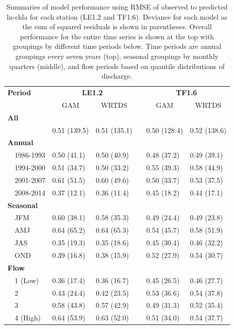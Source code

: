 \documentclass[letterpaper,12pt,oneside]{article}\usepackage[]{graphicx}\usepackage[]{color}
\begin{document}
\begin{table}[!tbp]
\caption{Summaries of model performance using \ac{RMSE} of observed to predicted ln-\ac{chla} for each station (LE1.2 and TF1.6).  Deviance for each model as the sum of squared residuals is shown in parentheses. Overall performance for the entire time series is shown at the top with groupings by different time periods below.  Time periods are annual groupings every seven years (top), seasonal groupings by monthly quarters (middle), and flow periods based on quantile distributions of discharge.\label{tab:perftoobs}} 
\begin{center}
\begin{tabular}{lllcll}
\hline\hline
\multicolumn{1}{l}{\bfseries Period}&\multicolumn{2}{c}{\bfseries LE1.2}&\multicolumn{1}{c}{\bfseries }&\multicolumn{2}{c}{\bfseries TF1.6}\tabularnewline
\cline{2-3} \cline{5-6}
\multicolumn{1}{l}{}&\multicolumn{1}{c}{GAM}&\multicolumn{1}{c}{WRTDS}&\multicolumn{1}{c}{}&\multicolumn{1}{c}{GAM}&\multicolumn{1}{c}{WRTDS}\tabularnewline
\hline
{\bfseries All}&&&&&\tabularnewline
~~&0.51 (139.5)&0.51 (135.1)&&0.50 (128.4)&0.52 (138.6)\tabularnewline
\hline
{\bfseries Annual}&&&&&\tabularnewline
~~1986-1993&0.50 (41.1)&0.50 (40.9)&&0.48 (37.2)&0.49 (39.1)\tabularnewline
~~1994-2000&0.51 (34.7)&0.50 (33.2)&&0.55 (39.3)&0.58 (44.9)\tabularnewline
~~2001-2007&0.61 (51.5)&0.60 (49.6)&&0.50 (33.7)&0.53 (37.5)\tabularnewline
~~2008-2014&0.37 (12.1)&0.36 (11.4)&&0.45 (18.2)&0.44 (17.1)\tabularnewline
\hline
{\bfseries Seasonal}&&&&&\tabularnewline
~~JFM&0.60 (38.1)&0.58 (35.3)&&0.49 (24.4)&0.49 (23.8)\tabularnewline
~~AMJ&0.64 (65.2)&0.64 (65.3)&&0.54 (45.7)&0.58 (51.9)\tabularnewline
~~JAS&0.35 (19.3)&0.35 (18.6)&&0.45 (30.4)&0.46 (32.2)\tabularnewline
~~OND&0.39 (16.8)&0.38 (15.9)&&0.52 (27.9)&0.54 (30.7)\tabularnewline
\hline
{\bfseries Flow}&&&&&\tabularnewline
~~1 (Low)&0.36 (17.4)&0.36 (16.7)&&0.45 (26.5)&0.46 (27.7)\tabularnewline
~~2&0.43 (24.4)&0.42 (23.5)&&0.53 (36.6)&0.54 (37.8)\tabularnewline
~~3&0.58 (43.8)&0.57 (42.9)&&0.49 (31.3)&0.52 (35.4)\tabularnewline
~~4 (High)&0.64 (53.9)&0.63 (52.0)&&0.51 (34.0)&0.54 (37.7)\tabularnewline
\hline
\end{tabular}\end{center}

\end{table}
\end{document}

